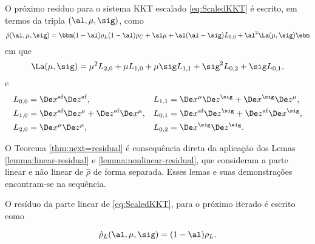 \begin{teo}
\label{thm:next=residual}
O próximo resíduo para o sistema KKT escalado  \eqref{eq:ScaledKKT} é escrito, em
termos da tripla $(\al,\mu,\sig)$, como 
\begin{equation}
\label{eq:next-residual-all}
\nextrho(\al,\mu,\sig) = \bbm (1-\al)\rho_L \\   (1-\al)\rho_C+ \al\mu + \al(\al-\sig)L_{0,0} +  
\al^2 \La(\mu,\sig) \ebm
\end{equation}
em que 
\begin{equation}
\label{eq:Lambda-mu-sigma}
\La(\mu,\sig) =  \mu^2
 L_{2,0} + \mu L_{1,0} + \mu \sig L_{1,1} + \sig^2L_{0,2} + \sig
 L_{0,1},
\end{equation}
e
\begin{equation}
\label{eq:defining-Lij}
\begin{aligned}
	L_{0,0} & = \dex\dez, & L_{1,1}  & = \Dex^\mu\Dez^\sig +
			\Dex^\sig\Dez^\mu, \\	
	L_{1,0} &  = \dex\Dez^\mu +
			\dez\Dex^\mu,  & L_{0,1}  & = \dex\Dez^\sig + \dez\Dex^\sig, \\	
	L_{2,0} &  = \Dex^\mu\Dez^\mu,  & L_{0,2}  & = \Dex^\sig\Dez^\sig .\\	
\end{aligned}
\end{equation}

\end{teo}

O Teorema \ref{thm:next=residual} é consequência direta da aplicação
dos Lemas \ref{lemma:linear-residual} e \ref{lemma:nonlinear-residual}, que
consideram a parte linear e não linear de  $\hat{\rho}$ de forma separada. Esses lemas
e suas demonstrações encontram-se na sequência. %
 
\begin{lema}\label{lemma:linear-residual}
O resíduo da parte linear de  \eqref{eq:ScaledKKT}, para o próximo iterado é
escrito como

\[
\hat{\rho}_L(\al,\mu,\sig) = (1-\al)\rho_L.
\]
 
\end{lema}


